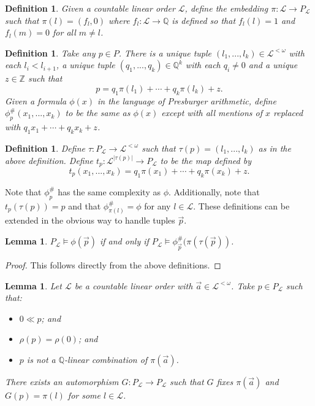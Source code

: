\documentclass{amsart}%
\numberwithin{theorem}{section}
\newtheorem{definition}[theorem]{Definition}
\newtheorem{lemma}[theorem]{Lemma}
\newcommand{\Q}{\mathbb{Q}}
\newcommand{\Z}{\mathbb{Z}}
\newcommand{\0}{\emptyset}
\newcommand{\lom}{^{< \omega}}
\newcommand{\LL}{\mathcal{L}}
\begin{document}
\begin{definition}
\label{def pi}
    Given a countable linear order $\LL$, define the embedding $\pi: \LL\to P_\LL$ such that $\pi(l)=(f_l,0)$ where $f_l:\LL\to \Q$ is defined so that $f_l(l)=1$ and $f_l(m)=0$ for all $m\neq l$. 
    \end{definition}

\begin{definition}
\label{def sharp}
    Take any $p\in P$.   There is a unique tuple $(l_1,...,l_k)\in \LL\lom$ with each $l_i<l_{i+1}$, a unique tuple $(q_1,...,q_k)\in \Q^k$ with each $q_i\neq 0$ and a unique $z\in \Z$ such that $$p=q_1\pi(l_1) +\cdots + q_k\pi(l_k) + z.$$ Given a  formula $\phi(  x)$ in the language of Presburger arithmetic, define $\phi_{p}^\#(x_1,...,x_k)$ to be the same as $\phi(x)$ except with all mentions of $x$ replaced with $q_1 x_1 +\cdots + q_kx_k +z$. 
\end{definition}


\begin{definition}
\label{def tau}
    Define $\tau:P_\LL\to \LL\lom$ such that $\tau(p)=(l_1,...,l_k)$ as in the above definition. Define $t_p:\LL^{|\tau(p)|}\to P_\LL$ to be the map defined by $$t_p(x_1,...,x_k)=q_1 \pi(x_1) +\cdots + q_k\pi(x_k) + z.$$ 
\end{definition}
Note that $\phi^\#_p$ has the same complexity as $\phi$. Additionally, note that  $t_p(\tau(p))=p$ and that $\phi^\#_{\pi(l)}=\phi$ for any $l\in \LL$. These definitions can be extended in the obvious way to  handle tuples $\vec p$. 


\begin{lemma}
\label{phi pound}
$P_\LL\models \phi (\vec p)$ if and only if $P_\LL\models \phi^\#_{\vec p}(\pi(\tau(\vec p))$. 
\end{lemma}

\begin{proof}
    This follows directly from the above definitions.
\end{proof}



\begin{lemma}
\label{lemma: automorphism}
    Let $\LL$ be a countable linear order with $\vec a \in \LL\lom$. Take $p\in P_\LL$ such that: \begin{itemize}
        \item $0\ll p$; and
        \item $\rho(p)=\rho(0)$; and
        \item $p$ is not a $\Q$-linear combination of $\pi(\vec a)$.
    \end{itemize} 
    There exists an automorphism $G:P_\LL\to P_\LL$ such that $G$ fixes $\pi(\vec a)$ and $G(p)=\pi(l)$ for some $l\in \LL$. 
\end{lemma}
\end{document}
